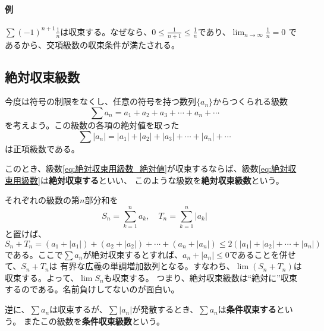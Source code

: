 \documentclass[a4j,dvipdfmx]{jsarticle}
\begin{document}
                \paragraph{例}$\displaystyle\sum (-1)^{n+1}\frac{1}{n}$は収束する。なぜなら、$\displaystyle 0\leq \frac{1}{n+1}\leq \frac{1}{n}$であり、$\displaystyle\lim_{n\to \infty}\frac{1}{n}=0$
                であるから、交項級数の収束条件が満たされる。
            \clearpage
            \subsection{絶対収束級数}
                今度は符号の制限をなくし、任意の符号を持つ数列$\{a_n\}$からつくられる級数
                \begin{equation*}
                    \sum a_n = a_1+a_2+a_3+\cdots+a_n+\cdots \label{eq:絶対収束用級数}
                \end{equation*}
                を考えよう。この級数の各項の絶対値を取った
                \begin{equation*}
                    \sum |a_n| = |a_1|+|a_2|+|a_3|+\cdots+|a_n|+\cdots\label{eq:絶対収束用級数_絶対値}
                \end{equation*}
                は正項級数である。

                このとき、級数\eqref{eq:絶対収束用級数_絶対値}が収束するならば、級数\eqref{eq:絶対収束用級数}は\textbf{絶対収束する}といい、
                このような級数を\textbf{絶対収束級数}という。

                それぞれの級数の第$n$部分和を
                \begin{equation*}
                    S_n = \sum_{k=1}^{n}a_k,\quad T_n = \sum_{k=1}^{n}|a_k|
                \end{equation*}
                と置けば、
                \begin{equation*}
                    S_n+T_n=(a_1+|a_1|)+(a_2+|a_2|)+\cdots+(a_n+|a_n|)\leq 2(|a_1|+|a_2|+\cdots+|a_n|)
                \end{equation*}
                である。ここで$\sum a_n$が絶対収束するとすれば、$a_n+|a_n|\leq 0$であることを併せて、$S_n+T_n$は
                有界な広義の単調増加数列となる。すなわち、$\lim (S_n+T_n)$は収束する。よって、$\lim S_n$も収束する。
                つまり、絶対収束級数は``絶対に''収束するのである。名前負けしてないのが面白い。

                逆に、$\sum a_n$は収束するが、$\sum|a_n|$が発散するとき、$\sum a_n$は\textbf{条件収束する}という。
                またこの級数を\textbf{条件収束級数}という。\\
\end{document}
